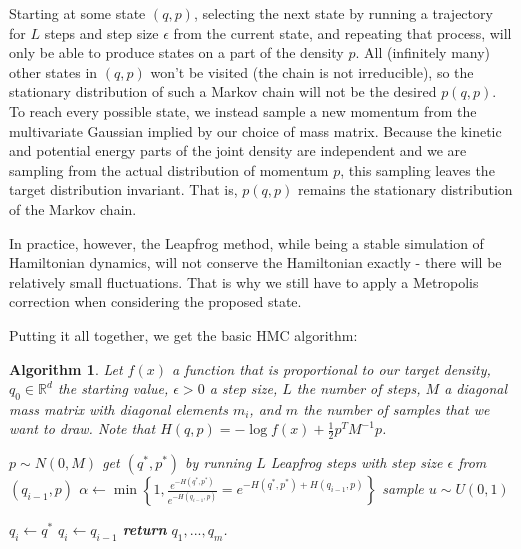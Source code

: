\documentclass{book}
\theoremstyle{plain}%
\newtheorem{algo}{Algorithm}[section]
\theoremstyle{definition}
\begin{document}
Starting at some state $(q, p)$, selecting the next state by running a trajectory for $L$ steps and step size $\epsilon$ from the current state, and repeating that process, will only be able to produce states on a part of the density $p$. All (infinitely many) other states in $(q, p)$ won't be visited (the chain is not irreducible), so the stationary distribution of such a Markov chain will not be the desired $p(q, p)$. To reach every possible state, we instead sample a new momentum from the multivariate Gaussian implied by our choice of mass matrix. Because the kinetic and potential energy parts of the joint density are independent and we are sampling from the actual distribution of momentum $p$, this sampling leaves the target distribution invariant. That is, $p(q, p)$ remains the stationary distribution of the Markov chain.

In practice, however, the Leapfrog method, while being a stable simulation of Hamiltonian dynamics, will not conserve the Hamiltonian exactly - there will be relatively small fluctuations. That is why we still have to apply a Metropolis correction when considering the proposed state.

Putting it all together, we get the basic HMC algorithm:

\begin{algo}
Let $f(x)$ a function that is proportional to our target density, $q_0 \in \mathbb{R}^d$ the starting value, $\epsilon > 0$ a step size, $L$ the number of steps, $M$ a diagonal mass matrix with diagonal elements $m_i$, and $m$ the number of samples that we want to draw. Note that $H(q, p) = -\log f(x) + \frac{1}{2}p^T M^{-1}p$.
\begin{algorithmic}[1]
     
\State $p \sim N(0, M)$     
\State get $(q^*, p^*)$ by running $L$ Leapfrog steps with step size $\epsilon$ from $(q_{i-1}, p)$ 
\State $\alpha \gets \min \left\lbrace 1, \frac{e^{-H(q^*, p^*)}}{e^{-H(q_{i-1}, p)}} = e^{-H(q^*, p^*) + H(q_{i-1}, p)}\right\rbrace$  
\State sample $u \sim U(0,1)$

\State $q_i \gets q^*$  
\Else 
\State $q_i \gets q_{i-1}$
\EndIf
              \EndFor
              \State \textbf{return} $q_1,...,q_m$.
        \EndProcedure
    \end{algorithmic}\label{alg:bootstrap}
\end{algo}
\end{document}

